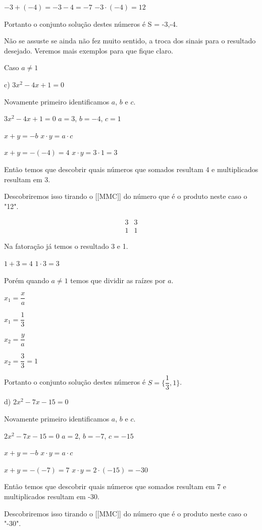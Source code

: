 \documentclass[letterpaper]{book}
\begin{document}
\(-3 + (-4) = -3 - 4 = -7\)  
\(-3 \cdot (-4) = 12\)

Portanto o conjunto solução destes números é S = {-3,-4}.

Não se assuste se ainda não fez muito sentido, a troca dos sinais para o resultado desejado. Veremos mais exemplos para que fique claro.

 Caso \(a \neq 1\) 

c) \(3x^{2} - 4x + 1 = 0\)

Novamente primeiro identificamos \(a\), \(b\) e \(c\).

\(3x^{2} - 4x + 1 = 0\)
\(a = 3\), $b = -4$, $c = 1$

\(x + y = -b\) 
\(x \cdot y = a \cdot c\)

\(x + y = -(-4) = 4\)  
\(x \cdot y = 3 \cdot 1 = 3\)

Então temos que descobrir quais números que somados resultam 4 e multiplicados resultam em 3.

Descobriremos isso tirando o [[MMC]] do número que é o produto neste caso o "12".

\[
\begin{array}{c|cc}
3 & 3 \\
1 & 1
\end{array}
\]

Na fatoração já temos o resultado 3 e 1.


\(1 + 3 = 4\)  
\(1 \cdot 3 = 3\)

Porém quando \(a \neq 1\) temos que dividir as raízes por \(a\).

\(x_1 = \dfrac{x}{a}\)

\(x_1 = \dfrac{1}{3}\)

\(x_2 = \dfrac{y}{a}\)

\(x_2 = \dfrac{3}{3} = 1\)

Portanto o conjunto solução destes números é \(S = \{\dfrac{1}{3},1\}\).

 d) \(2x^{2} -7x - 15 = 0\)

Novamente primeiro identificamos \(a\), $b$ e $c$.

\(2x^{2} -7x - 15 = 0\)
\(a = 2\), $b = -7$, $c = -15$

\(x + y = -b\) 
\(x \cdot y = a \cdot c\)

\(x + y = -(-7) = 7\)  
\(x \cdot y = 2 \cdot (-15) = -30\)

Então temos que descobrir quais números que somados resultam em 7 e multiplicados resultam em -30.

Descobriremos isso tirando o [[MMC]] do número que é o produto neste caso o "-30".
\end{document}
